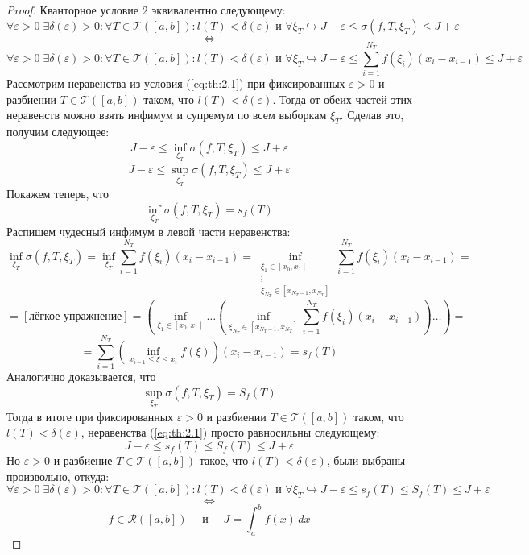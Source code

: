 \documentclass[11pt]{article}
\begin{document}
\begin{proof}
    Кванторное условие $2$ эквивалентно следующему:
    \[\forall \varepsilon > 0 \; \exists \delta (\varepsilon) > 0: \forall T \in \mathcal{T}([a, b]): l(T) < \delta(\varepsilon) \text{ и } \forall \xi_T \hookrightarrow  J - \varepsilon \leq \sigma(f, T, \xi_T) \leq J + \varepsilon\]
    \[\iff\]
    \begin{equation*} \label{eq:th:2.1} \tag{$\star$}
        \forall \varepsilon > 0 \; \exists \delta (\varepsilon) > 0: \forall T \in \mathcal{T}([a, b]): l(T) < \delta(\varepsilon) \text{ и } \forall \xi_T \hookrightarrow  J - \varepsilon \leq \sum_{i = 1}^{N_T} f(\xi_i) (x_i - x_{i - 1}) \leq J + \varepsilon
    \end{equation*}
    Рассмотрим неравенства из условия (\ref{eq:th:2.1}) при фиксированных $\varepsilon > 0$ и разбиении $T \in \mathcal{T}([a, b])$ таком, что $l(T) < \delta(\varepsilon)$. Тогда от обеих частей этих неравенств можно взять инфимум и супремум по всем выборкам $\xi_T$. Сделав это, получим следующее:
    \[J - \varepsilon \leq \inf_{\xi_T} \sigma(f, T, \xi_T) \leq J + \varepsilon\] 
    \[J - \varepsilon \leq \sup_{\xi_T} \sigma(f, T, \xi_T) \leq J + \varepsilon\]
    Покажем теперь, что
    \[\inf_{\xi_T} \sigma(f, T, \xi_T) = s_f (T)\]
    Распишем чудесный инфимум в левой части неравенства:
    \[\inf_{\xi_T} \sigma(f, T, \xi_T) = \inf_{\xi_T} \sum_{i = 1}^{N_T} f(\xi_i) (x_i - x_{i - 1}) = \inf_{\substack{\xi_1 \in [x_0, x_1] \\ \vdots \\ \xi_{N_T} \in \left[x_{N_T - 1}, x_{N_T}\right]}} \sum_{i = 1}^{N_T} f(\xi_i) (x_i - x_{i - 1}) = \]
    \[= [\text{лёгкое упражнение}] = \left( \inf_{\xi_1 \in [x_0, x_1]} \ldots \left( \inf_{\xi_{N_T} \in \left[x_{N_T - 1}, x_{N_T}\right]} \sum_{i = 1}^{N_T} f(\xi_i) (x_i - x_{i - 1}) \right) \ldots \right) = \]
    \[= \sum_{i = 1}^{N_T} \left(\inf_{x_{i - 1} \leq \xi \leq x_i} f(\xi)\right) (x_i - x_{i - 1}) = s_f(T)\]
    Аналогично доказывается, что 
    \[\sup_{\xi_T} \sigma(f, T, \xi_T) = S_f (T)\]
    Тогда в итоге при фиксированных $\varepsilon > 0$ и разбиении $T \in \mathcal{T}([a, b])$ таком, что $l(T) < \delta(\varepsilon)$, неравенства (\ref{eq:th:2.1}) просто равносильны следующему:
    \[J - \varepsilon \leq s_f(T) \leq S_f(T) \leq J + \varepsilon\]
    Но $\varepsilon > 0$ и разбиение $T \in \mathcal{T}([a, b])$ такое, что $l(T) < \delta(\varepsilon)$, были выбраны произвольно, откуда:
    \[\forall \varepsilon > 0 \; \exists \delta (\varepsilon) > 0: \forall T \in \mathcal{T}([a, b]): l(T) < \delta(\varepsilon) \text{ и } \forall \xi_T \hookrightarrow J - \varepsilon \leq s_f(T) \leq S_f(T) \leq J + \varepsilon\]
    \[\iff\]
    \[f \in \mathcal{R}([a, b]) \quad \text{ и } \quad J = \int_{a}^{b} f(x) \,dx\]
\end{proof}
\end{document}
